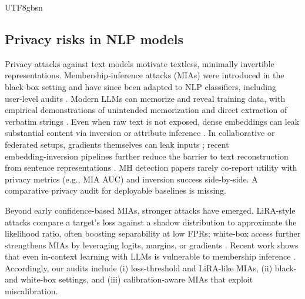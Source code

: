 \documentclass[lettersize,journal]{IEEEtran}
\begin{document}
\begin{CJK*}{UTF8}{gbsn}
\subsection{Privacy risks in NLP models}
Privacy attacks against text models motivate textless, minimally invertible representations. Membership‑inference attacks (MIAs) were introduced in the black‑box setting and have since been adapted to NLP classifiers, including user‑level audits \cite{shokri2017mia,shejwalkar2021nlpmia}. Modern LLMs can memorize and reveal training data, with empirical demonstrations of unintended memorization and direct extraction of verbatim strings \cite{carlini2019secretsharer,carlini2021extracting,carlini2022memorization}. Even when raw text is not exposed, dense embeddings can leak substantial content via inversion or attribute inference \cite{morris2023vec2text,song2020embeddingsleak,meehan2022sentprivacy}. In collaborative or federated setups, gradients themselves can leak inputs \cite{zhu2019dlg}; recent embedding‑inversion pipelines further reduce the barrier to text reconstruction from sentence representations \cite{li2023geninv}. MH detection papers rarely co‑report utility with privacy metrics (e.g., MIA AUC) and inversion success side‑by‑side. A comparative privacy audit for deployable baselines is missing.

Beyond early confidence-based MIAs, stronger attacks have emerged. LiRA-style attacks compare a target's loss against a shadow distribution to approximate the likelihood ratio, often boosting separability at low FPRs; white-box access further strengthens MIAs by leveraging logits, margins, or gradients \cite{shokri2017mia,shejwalkar2021nlpmia}. Recent work shows that even in-context learning with LLMs is vulnerable to membership inference \cite{wen2024miaicl}. Accordingly, our audits include (i) loss-threshold and LiRA-like MIAs, (ii) black- and white-box settings, and (iii) calibration-aware MIAs that exploit miscalibration.



\end{CJK*}
\end{document}

